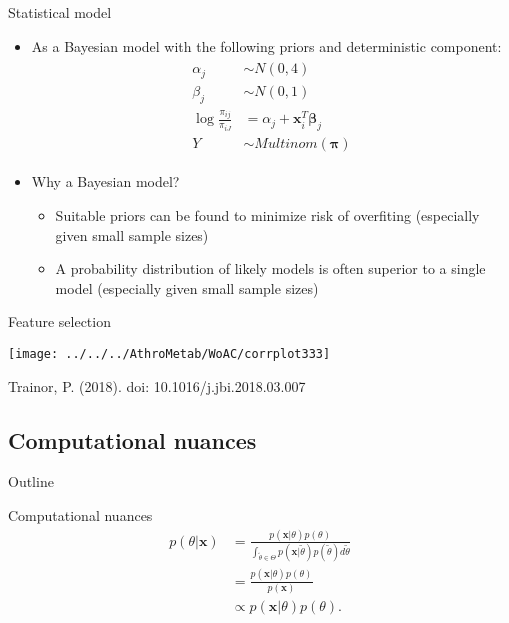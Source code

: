 \documentclass[xcolor=dvipsnames]{beamer}
\begin{document}
\begin{frame}{Statistical model}
\vspace{-10.5pt}
\begin{itemize}
\item As a Bayesian model with the following priors and deterministic component:
\begin{align*}
\begin{split}
\alpha_j &\sim N(0,4) \\
\beta_j &\sim N(0,1) \\
\log \frac{\pi_{ij}}{\pi_{iJ}} &= \alpha_j + \textbf{x}_i^T \boldsymbol{\beta}_j \\
Y &\sim Multinom(\boldsymbol{\pi})
\end{split}
\end{align*} \pause
\item Why a Bayesian model? \pause
\begin{itemize}
	\item Suitable priors can be found to minimize risk of overfiting (especially given small sample sizes) \pause
	\item A probability distribution of likely models is often superior to a single model (especially given small sample sizes)
\end{itemize} 
\end{itemize}
\end{frame}

\begin{frame}{Feature selection}
\vspace{-10pt}
\begin{center}
\texttt{[image: ../../../AthroMetab/WoAC/corrplot333]}

Trainor, P. (2018). doi: 10.1016/j.jbi.2018.03.007 
\end{center}
\end{frame}

\subsection{Computational nuances}
\begin{frame}{Outline}
\vspace{-10.5pt}
\tableofcontents[currentsection,subsectionstyle=show/shaded/hide]
\end{frame}

\begin{frame}{Computational nuances}
\begin{align*}
p(\theta|\textbf{x})&=\frac{p(\textbf{x}|\theta)p(\theta)}{\int_{\tilde{\theta} \in \Theta} p(\textbf{x}|\tilde{\theta})p(\tilde{\theta})d\tilde{\theta}}\\ &=\frac{p(\textbf{x}|\theta)p(\theta)}{p(\textbf{x})}\\
&\propto p(\textbf{x}|\theta)p(\theta).
\end{align*}
\end{frame}
\end{document}

